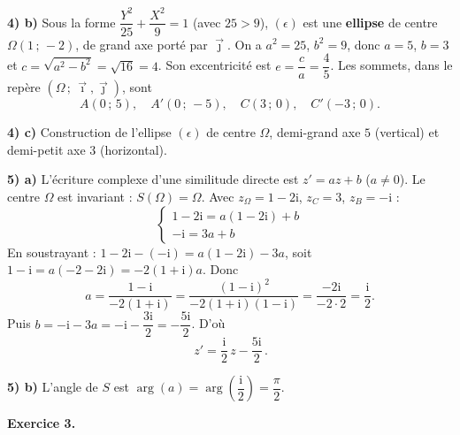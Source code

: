 \noindent\textbf{4) b)} Sous la forme $\dfrac{Y^2}{25}+\dfrac{X^2}{9}=1$ (avec $25>9$), $(\epsilon)$
est une \textbf{ellipse} de centre $\Omega(1\,;\,-2)$, de grand axe porté par $\vec\jmath$. On a
$a^2=25$, $b^2=9$, donc $a=5$, $b=3$ et $c=\sqrt{a^2-b^2}=\sqrt{16}=4$. Son excentricité est
$e=\dfrac ca=\dfrac45$. Les sommets, dans le repère $(\Omega\,;\,\vec\imath,\vec\jmath)$, sont
\[
A(0\,;\,5),\quad A'(0\,;\,-5),\quad C(3\,;\,0),\quad C'(-3\,;\,0).
\]

\noindent\textbf{4) c)} Construction de l'ellipse $(\epsilon)$ de centre $\Omega$, demi-grand axe
$5$ (vertical) et demi-petit axe $3$ (horizontal).
\begin{illus}
\end{illus}

\noindent\textbf{5) a)} L'écriture complexe d'une similitude directe est $z'=az+b$ ($a\ne0$). Le
centre $\Omega$ est invariant : $S(\Omega)=\Omega$. Avec $z_\Omega=1-2\mathrm i$, $z_C=3$,
$z_B=-\mathrm i$ :
\[
\begin{cases}1-2\mathrm i=a(1-2\mathrm i)+b\\ -\mathrm i=3a+b\end{cases}
\]
En soustrayant : $1-2\mathrm i-(-\mathrm i)=a(1-2\mathrm i)-3a$, soit
$1-\mathrm i=a(-2-2\mathrm i)=-2(1+\mathrm i)a$. Donc
\[
a=\frac{1-\mathrm i}{-2(1+\mathrm i)}=\frac{(1-\mathrm i)^2}{-2(1+\mathrm i)(1-\mathrm i)}=\frac{-2\mathrm i}{-2\cdot2}=\frac{\mathrm i}{2}.
\]
Puis $b=-\mathrm i-3a=-\mathrm i-\dfrac{3\mathrm i}{2}=-\dfrac{5\mathrm i}{2}$. D'où
\[
\boxed{\,z'=\frac{\mathrm i}{2}\,z-\frac{5\mathrm i}{2}\,}.
\]

\noindent\textbf{5) b)} L'angle de $S$ est $\arg(a)=\arg\!\left(\dfrac{\mathrm i}{2}\right)=\dfrac\pi2$.

\bigskip
\noindent\textbf{Exercice 3.}

